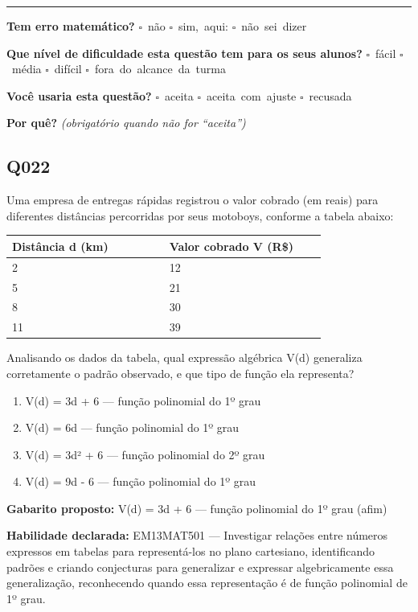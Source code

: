 \documentclass[11pt,a4paper]{article}
\begin{document}
\noindent\rule{\linewidth}{0.4pt}
\textbf{Tem erro matemático?}\quad
\mbox{$\square$~não} \quad \mbox{$\square$~sim, aqui:} \underline{\hspace{5cm}}
\quad \mbox{$\square$~não sei dizer}

\textbf{Que nível de dificuldade esta questão tem para os seus alunos?}\quad
\mbox{$\square$~fácil} \quad \mbox{$\square$~média} \quad
\mbox{$\square$~difícil} \quad \mbox{$\square$~fora do alcance da turma}

\textbf{Você usaria esta questão?}\quad
\mbox{$\square$~aceita} \quad \mbox{$\square$~aceita com ajuste} \quad
\mbox{$\square$~recusada}

\textbf{Por quê?} \emph{(obrigatório quando não for ``aceita'')}

\underline{\hspace{\linewidth}}

\underline{\hspace{\linewidth}}
\vspace{0.6em}

\begin{samepage}
\subsection*{Q022}
Uma empresa de entregas rápidas registrou o valor cobrado (em reais) para diferentes distâncias percorridas por seus motoboys, conforme a tabela abaixo:

\begin{center}
\begin{tabular}{|p{0.430\linewidth}|p{0.430\linewidth}|}
\hline
\textbf{Distância d (km)} & \textbf{Valor cobrado V (R\$)} \\
\hline
2 & 12 \\
\hline
5 & 21 \\
\hline
8 & 30 \\
\hline
11 & 39 \\
\hline
\end{tabular}
\end{center}

Analisando os dados da tabela, qual expressão algébrica V(d) generaliza corretamente o padrão observado, e que tipo de função ela representa?
\begin{enumerate}[label=(\alph*),nosep,leftmargin=*]
\item V(d) = 3d + 6 — função polinomial do 1º grau
\item V(d) = 6d — função polinomial do 1º grau
\item V(d) = 3d² + 6 — função polinomial do 2º grau
\item V(d) = 9d - 6 — função polinomial do 1º grau
\end{enumerate}

\textbf{Gabarito proposto:} V(d) = 3d + 6 — função polinomial do 1º grau (afim)

\textbf{Habilidade declarada:} EM13MAT501 --- Investigar relações entre números expressos em tabelas para representá-los no plano cartesiano, identificando padrões e criando conjecturas para generalizar e expressar algebricamente essa generalização, reconhecendo quando essa representação é de função polinomial de 1º grau.
\end{samepage}
\end{document}
